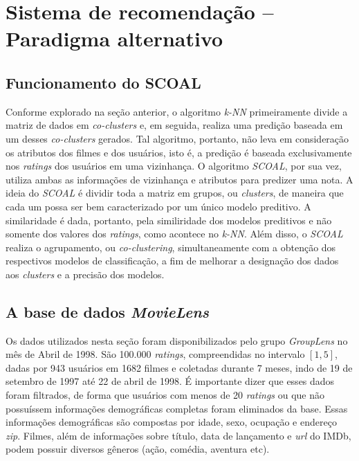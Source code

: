 \section{Sistema de recomendação – Paradigma alternativo}

\subsection{Funcionamento do SCOAL}

Conforme explorado na seção anterior, o algoritmo \textit{k-NN} primeiramente
divide a matriz de dados em \textit{co-clusters} e, em seguida, realiza uma
predição baseada em um desses \textit{co-clusters} gerados. Tal algoritmo,
portanto, não leva em consideração os atributos dos filmes e dos usuários, isto
é, a predição é baseada exclusivamente nos \textit{ratings} dos usuários em uma
vizinhança. O algoritmo \textit{SCOAL}, por sua vez, utiliza ambas as
informações de vizinhança e atributos para predizer uma nota. A ideia do
\textit{SCOAL} é dividir toda a matriz em grupos, ou \textit{clusters}, de
maneira que cada um possa ser bem caracterizado por um único modelo preditivo. A
similaridade é dada, portanto, pela similiridade dos modelos preditivos e não
somente dos valores dos \textit{ratings}, como acontece no \textit{k-NN}. Além
disso, o \textit{SCOAL} realiza o agrupamento, ou \textit{co-clustering}, simultaneamente
com a obtenção dos respectivos modelos de classificação, a fim de melhorar a
designação dos dados aos \textit{clusters} e a precisão dos modelos.

\subsection{A base de dados \textit{MovieLens}}

Os dados utilizados nesta seção foram disponibilizados pelo grupo
\textit{GroupLens} no mês de Abril de 1998. São 100.000 \textit{ratings},
compreendidas no intervalo \([1,5]\), dadas por 943 usuários em 1682 filmes e
coletadas durante 7 meses, indo de 19 de setembro de 1997 até 22 de abril de
1998. É importante dizer que esses dados foram filtrados, de forma que usuários
com menos de 20 \textit{ratings} ou que não possuíssem informações
demográficas completas foram eliminados da base. Essas informações demográficas
são compostas por idade, sexo, ocupação e endereço \textit{zip}. Filmes, além
de informações sobre título, data de lançamento e \textit{url} do IMDb,
podem possuir diversos gêneros (ação, comédia, aventura etc).

